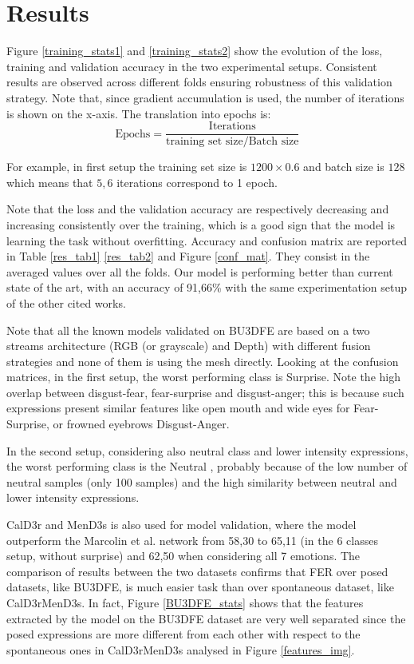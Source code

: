 
\section{Results}

Figure \ref{training_stats1} and \ref{training_stats2}  show the evolution of the loss, training and validation accuracy in the two experimental setups. Consistent results are observed across different folds ensuring robustness of this validation strategy. Note that, since gradient accumulation is used, the number of iterations is shown on the x-axis. The translation into epochs is:
\begin{equation}
    \text{Epochs} = \frac{\text{Iterations}}{\text{training set size}/\text{Batch size}}
\end{equation}

For example, in first setup the training set size is $1200\times0.6$ and batch size is $128$ which means that $5,6$ iterations correspond to 1 epoch. 

Note that the loss and the validation accuracy are respectively decreasing and increasing consistently over the training, which is a good sign that the model is learning the task without overfitting. 
Accuracy and confusion matrix are reported in Table \ref{res_tab1} \ref{res_tab2} and Figure \ref{conf_mat}. They consist in the averaged values over all the folds. Our model is performing better than current state of the art, with an accuracy of 91,66\% with the same experimentation setup of the other cited works.

Note that all the known models validated on BU3DFE are based on a two streams architecture (RGB (or grayscale) and Depth) with different fusion strategies and none of them is using the mesh directly. Looking at the confusion matrices, in the first setup, the worst performing class is Surprise. Note the high overlap between disgust-fear, fear-surprise and disgust-anger; this is because such expressions present similar features like open mouth and wide eyes for Fear-Surprise, or frowned eyebrows Disgust-Anger.  

In the second setup, considering also neutral class and lower intensity expressions, the worst performing class is the Neutral , probably because of the low number of neutral samples (only 100 samples) and the high similarity between neutral and lower intensity expressions.

CalD3r and MenD3s is also used for model validation, where the model outperform the Marcolin et al. network \cite{CalD3rMenD3s} from 58,30 to 65,11 (in the 6 classes setup, without surprise) and 62,50 when considering all 7 emotions. The comparison of results between the two datasets confirms that FER over posed datasets, like BU3DFE, is much easier task than over spontaneous dataset, like CalD3rMenD3s. In fact, Figure \ref{BU3DFE_stats} shows that the features extracted by the model on the BU3DFE dataset are very well separated since the posed expressions are more different from each other with respect to the spontaneous ones in CalD3rMenD3s analysed in Figure \ref{features_img}. 

